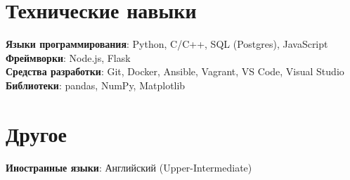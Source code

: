 \section{Технические навыки}
\begin{itemize}[leftmargin=0.15in, label={}]
  \small{\item{
        \textbf{Языки программирования}{: Python, C/C++, SQL (Postgres), JavaScript} \\
        \textbf{Фреймворки}{: Node.js, Flask} \\
        \textbf{Средства разработки}{: Git, Docker, Ansible, Vagrant, VS Code, Visual Studio} \\
        \textbf{Библиотеки}{: pandas, NumPy, Matplotlib}
        }}
\end{itemize}

\section{Другое}
\begin{itemize}[leftmargin=0.15in, label={}]
  \small{\item{
        \textbf{Иностранные языки}{: Английский (Upper-Intermediate)} \\
        }}
\end{itemize}
